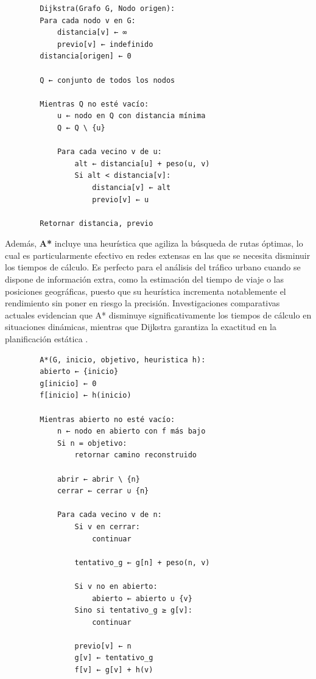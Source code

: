 \begin{listing}[H]
    \caption{Pseudocódigo del Algoritmo Dijkstra}
    \label{lst:dijkstra}
    \begin{verbatim}
        Dijkstra(Grafo G, Nodo origen):
        Para cada nodo v en G:
            distancia[v] ← ∞
            previo[v] ← indefinido
        distancia[origen] ← 0
        
        Q ← conjunto de todos los nodos

        Mientras Q no esté vacío:
            u ← nodo en Q con distancia mínima
            Q ← Q \ {u}

            Para cada vecino v de u:
                alt ← distancia[u] + peso(u, v)
                Si alt < distancia[v]:
                    distancia[v] ← alt
                    previo[v] ← u

        Retornar distancia, previo
    \end{verbatim}
\end{listing}

Además, \textbf{A*} incluye una heurística que agiliza la búsqueda de rutas óptimas, lo cual es particularmente efectivo en redes extensas en las que se necesita disminuir los 
tiempos de cálculo. Es perfecto para el análisis del tráfico urbano cuando se dispone de información extra, como la estimación del tiempo de viaje o las posiciones geográficas, 
puesto que su heurística incrementa notablemente el rendimiento sin poner en riesgo la precisión.
Investigaciones comparativas actuales evidencian que A* disminuye significativamente los tiempos de cálculo en situaciones dinámicas, mientras que Dijkstra garantiza la 
exactitud en la planificación estática \cite{ayari_optimizing_2025}. 

\begin{listing}[H]
    \caption{Pseudocodigo del algoritmo A*}
    \label{lst:a-star}
    \begin{verbatim}
        A*(G, inicio, objetivo, heuristica h):
        abierto ← {inicio}
        g[inicio] ← 0
        f[inicio] ← h(inicio)

        Mientras abierto no esté vacío:
            n ← nodo en abierto con f más bajo
            Si n = objetivo:
                retornar camino reconstruido

            abrir ← abrir \ {n}
            cerrar ← cerrar ∪ {n}

            Para cada vecino v de n:
                Si v en cerrar:
                    continuar

                tentativo_g ← g[n] + peso(n, v)

                Si v no en abierto:
                    abierto ← abierto ∪ {v}
                Sino si tentativo_g ≥ g[v]:
                    continuar

                previo[v] ← n
                g[v] ← tentativo_g
                f[v] ← g[v] + h(v)
    \end{verbatim}
\end{listing}

